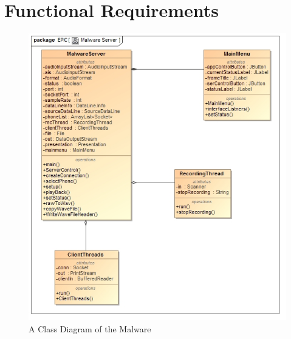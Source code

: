 \documentclass{article}
\begin{document}
	\section{Functional Requirements}
		\begin{figure}[H]
 			 \centering
			  \includegraphics[width=12cm]{MalwareClass}
		 	 \caption{A Class Diagram of the Malware}
		\end{figure}
		
        
\end{document}
